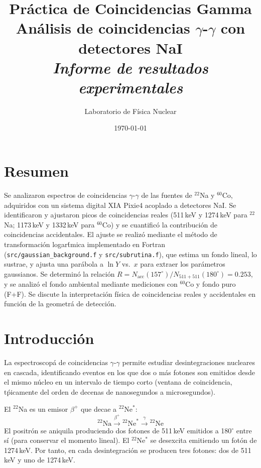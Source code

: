 \documentclass[12pt,a4paper]{article}
\title{\vspace{-1.5cm}\textbf{Pr\'actica de Coincidencias Gamma}\\
       \large An\'alisis de coincidencias $\gamma$-$\gamma$ con detectores NaI\\[0.3cm]
       \normalsize\textit{Informe de resultados experimentales}}
\author{Laboratorio de F\'isica Nuclear}
\date{\today}
\begin{document}
\maketitle
\thispagestyle{empty}

\section*{Resumen}

Se analizaron espectros de coincidencias $\gamma$-$\gamma$ de las fuentes de $^{22}$Na y $^{60}$Co,
adquiridos con un sistema digital XIA Pixie4 acoplado a detectores NaI.
Se identificaron y ajustaron picos de coincidencias reales (511\,keV y 1274\,keV para $^{22}$Na;
1173\,keV y 1332\,keV para $^{60}$Co) y se cuantific\'o la contribuci\'on de coincidencias accidentales.
El ajuste se realiz\'o mediante el m\'etodo de transformaci\'on logar\'tmica implementado en
Fortran (\texttt{src/gaussian\_background.f} y \texttt{src/subrutina.f}), que estima un fondo
lineal, lo sustrae, y ajusta una par\'abola a $\ln Y$ vs.\ $x$ para extraer los par\'ametros
gaussianos.
Se determin\'o la relaci\'on $R = N_{\text{acc}}(157^\circ)/N_{511+511}(180^\circ) = 0.253$,
y se analiz\'o el fondo ambiental mediante mediciones con $^{60}$Co y fondo puro (F+F).
Se discute la interpretaci\'on f\'isica de coincidencias reales y accidentales
en funci\'on de la geometr\'a de detecci\'on.

\newpage
\setcounter{section}{1}

\section{Introducci\'on}

La espectroscop\'a de coincidencias $\gamma$-$\gamma$ permite estudiar desintegraciones nucleares
en cascada, identificando eventos en los que dos o m\'as fotones son emitidos desde el mismo
n\'ucleo en un intervalo de tiempo corto (ventana de coincidencia, t\'picamente del orden de
decenas de nanosegundos a microsegundos).

El $^{22}$Na es un emisor $\beta^+$ que decae a $^{22}$Ne$^*$:
\begin{equation}
{}^{22}\text{Na} \xrightarrow{\beta^+} {}^{22}\text{Ne}^* \xrightarrow{\gamma} {}^{22}\text{Ne}
\end{equation}
El positr\'on se aniquila produciendo dos fotones de 511\,keV emitidos a 180$^\circ$ entre s\'i
(para conservar el momento lineal). El $^{22}$Ne$^*$ se desexcita emitiendo un fot\'on de
1274\,keV. Por tanto, en cada desintegraci\'on se producen tres fotones: dos de 511\,keV y
uno de 1274\,keV.
\end{document}
